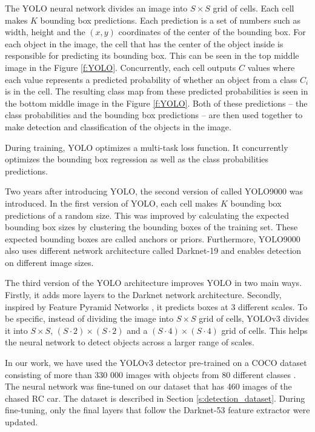 \documentclass{ctuthesis/ctuthesis}
\begin{document}
The YOLO neural network divides an image into $S\times S$ grid of cells. Each cell makes $K$ bounding box predictions. Each prediction is a set of numbers such as width, height and the $(x,y)$ coordinates of the center of the bounding box. For each object in the image, the cell that has the center of the object inside is responsible for predicting its bounding box. This can be seen in the top middle image in the Figure \ref{f:YOLO}. Concurrently, each cell outputs $C$ values where each value represents a predicted probability of whether an object from a class $C_i$ is in the cell. The resulting class map from these predicted probabilities is seen in the bottom middle image in the Figure \ref{f:YOLO}. Both of these predictions -- the class probabilities and the bounding box predictions -- are then used together to make detection and classification of the objects in the image.
\par

During training, YOLO optimizes a multi-task loss function. It concurrently optimizes the bounding box regression as well as the class probabilities predictions.


Two years after introducing YOLO, the second version of called YOLO9000 \cite{YOLO9000} was introduced. In the first version of YOLO, each cell makes $K$ bounding box predictions of a random size. This was improved by calculating the expected bounding box sizes by clustering the bounding boxes of the training set. These expected bounding boxes are called anchors or priors. Furthermore, YOLO9000 also uses different network architecture called Darknet-19 and enables detection on different image sizes. \par


The third version of the YOLO architecture \cite{YOLOv3} improves YOLO in two main ways. Firstly, it adds more layers to the Darknet network architecture. Secondly, inspired by Feature Pyramid Networks \cite{FPN}, it predicts boxes at 3 different scales. To be specific, instead of dividing the image into $S\times S$ grid of cells, YOLOv3 divides it into $S\times S$, $(S\cdot2)\times (S\cdot2)$ and a $(S\cdot4)\times (S\cdot4)$ grid of cells. This helps the neural network to detect objects across a larger range of scales.


In our work, we have used the YOLOv3 detector pre-trained on a COCO dataset consisting of more than 330 000 images with objects from 80 different classes \cite{COCO_dataset}. The neural network was fine-tuned on our dataset that has 460 images of the chased RC car. The dataset is described in Section \ref{s:detection_dataset}. During fine-tuning, only the final layers that follow the Darknet-53 feature extractor were updated.
\end{document}
